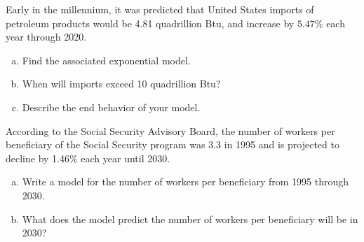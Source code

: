\documentclass[notes]{subfiles}
\begin{document}
		\begin{ex} 
			Early in the millennium, it was predicted that United States imports of petroleum products would be 4.81 quadrillion Btu, and increase by $5.47\%$ each year through 2020.
			\begin{enumerate}[(a)]
				\item Find the associated exponential model.
				\item When will imports exceed 10 quadrillion Btu?
				\item Describe the end behavior of your model.
			\end{enumerate}
		\end{ex}
			\newpage

		\begin{ex}
			According to the Social Security Advisory Board, the number of workers per beneficiary of the Social Security program was 3.3 in 1995 and is projected to decline by 1.46\% each year until 2030.
			\begin{enumerate}[(a)]
				\item Write a model for the number of workers per beneficiary from 1995 through 2030.
					\vs{1}
				\item What does the model predict the number of workers per beneficiary will be in 2030?
					\vs{.5}
			\end{enumerate}
		\end{ex}
\end{document}
